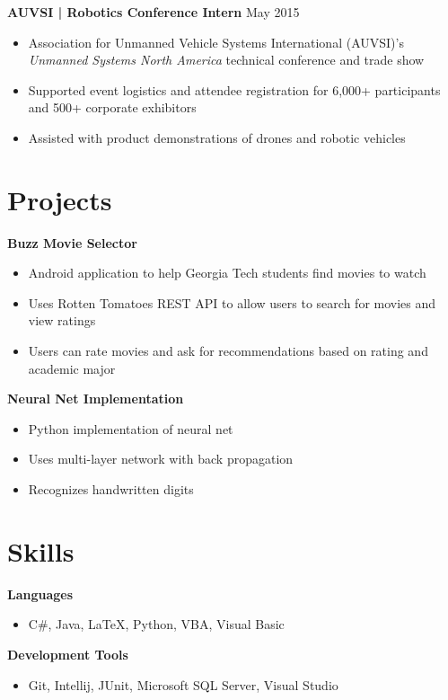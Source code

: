 \documentclass[10pt]{article}
\newcommand{\pipe}{| }
\begin{document}
\vspace{3pt}

\textbf{AUVSI \pipe Robotics Conference Intern} \hfill May 2015
\begin{itemize}
    \item Association for Unmanned Vehicle Systems International (AUVSI)'s \emph{Unmanned Systems North America} technical conference and trade show
    \item Supported event logistics and attendee registration for 6,000+ participants and 500+ corporate exhibitors
    \item Assisted with product demonstrations of drones and robotic vehicles
\end{itemize}

\section*{Projects}
\textbf{Buzz Movie Selector}
\begin{itemize}
    \item Android application to help Georgia Tech students find movies to watch
    \item Uses Rotten Tomatoes REST API to allow users to search for movies and view ratings
    \item Users can rate movies and ask for recommendations based on rating and academic major
\end{itemize}

\textbf{Neural Net Implementation}
\begin{itemize}
    \item Python implementation of neural net
    \item Uses multi-layer network with back propagation
    \item Recognizes handwritten digits
\end{itemize}

\section*{Skills}
\textbf{Languages}
\begin{itemize}
    \item C\#, Java, \LaTeX, Python, VBA, Visual Basic
\end{itemize}

\vspace{3pt}

\textbf{Development Tools}
\begin{itemize}
    \item Git, Intellij, JUnit, Microsoft SQL Server, Visual Studio
\end{itemize}
\end{document}
